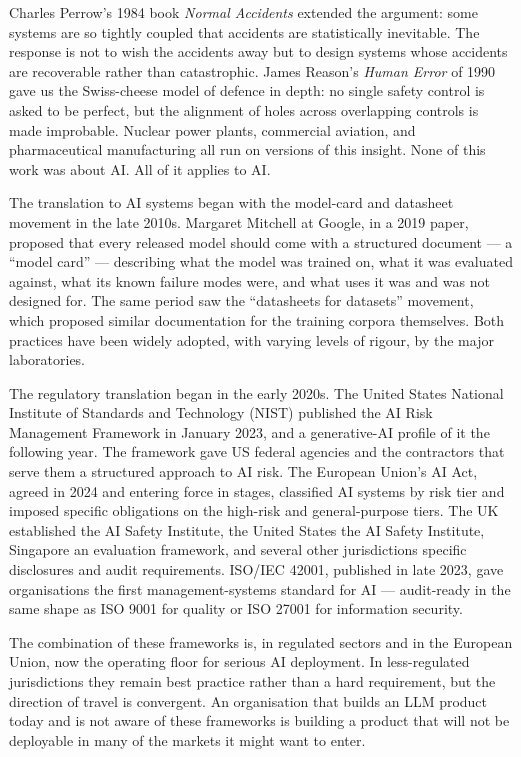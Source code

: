 Charles Perrow's 1984 book \emph{Normal Accidents} extended
the argument: some systems are so tightly coupled that
accidents are statistically inevitable. The response is not
to wish the accidents away but to design systems whose
accidents are recoverable rather than catastrophic. James
Reason's \emph{Human Error} of 1990 gave us the Swiss-cheese
model of defence in depth: no single safety control is asked
to be perfect, but the alignment of holes across overlapping
controls is made improbable. Nuclear power plants, commercial
aviation, and pharmaceutical manufacturing all run on
versions of this insight. None of this work was about AI. All
of it applies to AI.

The translation to AI systems began with the model-card and
datasheet movement in the late 2010s. Margaret Mitchell at
Google, in a 2019 paper, proposed that every released model
should come with a structured document --- a ``model card''
--- describing what the model was trained on, what it was
evaluated against, what its known failure modes were, and what
uses it was and was not designed for. The same period saw the
``datasheets for datasets'' movement, which proposed similar
documentation for the training corpora themselves. Both
practices have been widely adopted, with varying levels of
rigour, by the major laboratories.

The regulatory translation began in the early 2020s. The
United States National Institute of Standards and Technology
(NIST) published the AI Risk Management Framework in January
2023, and a generative-AI profile of it the following year.
The framework gave US federal agencies and the contractors
that serve them a structured approach to AI risk. The
European Union's AI Act, agreed in 2024 and entering force in
stages, classified AI systems by risk tier and imposed
specific obligations on the high-risk and general-purpose
tiers. The UK established the AI Safety Institute, the United
States the AI Safety Institute, Singapore an evaluation
framework, and several other jurisdictions specific
disclosures and audit requirements. ISO/IEC 42001, published
in late 2023, gave organisations the first management-systems
standard for AI --- audit-ready in the same shape as ISO 9001
for quality or ISO 27001 for information security.

The combination of these frameworks is, in regulated sectors
and in the European Union, now the operating floor for
serious AI deployment. In less-regulated jurisdictions they
remain best practice rather than a hard requirement, but the
direction of travel is convergent. An organisation that
builds an LLM product today and is not aware of these
frameworks is building a product that will not be deployable
in many of the markets it might want to enter.

